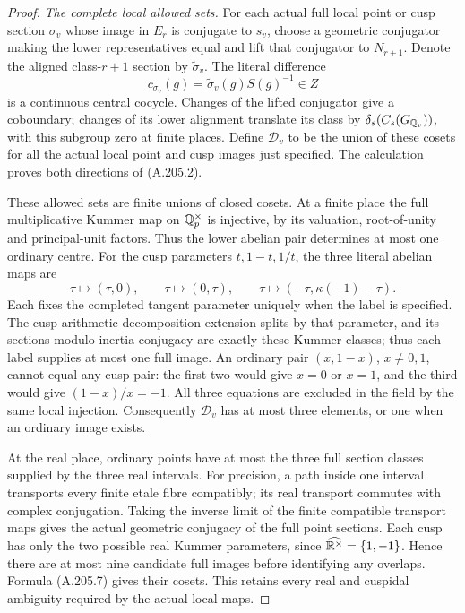 \begin{proof}
\emph{The complete local allowed sets.}
For each actual full local point or cusp section \(\sigma_v\)
whose image in \(E_r\) is conjugate to \(s_v\), choose
a geometric conjugator making the lower representatives
equal and lift that conjugator to \(N_{r+1}\).
Denote the aligned class-\(r+1\) section by
\(\widetilde\sigma_v\).  The literal difference
\[
 c_{\sigma_v}(g)=\widetilde\sigma_v(g)S(g)^{-1}\in Z
\tag{A.205.8}
\]
is a continuous central cocycle.  Changes of the lifted
conjugator give a coboundary; changes of its lower alignment
translate its class by \(\delta_s(C_s(G_{\mathbb Q_v}))\),
with this subgroup zero at finite places.  Define
\(\mathcal D_v\) to be the union of these cosets for all
the actual local point and cusp images just specified.
The calculation proves both directions of (A.205.2).

These allowed sets are finite unions of closed cosets.
At a finite place the full multiplicative Kummer map on
\(\mathbb Q_p^\times\) is injective, by its valuation, root-of-unity
and principal-unit factors.  Thus the lower abelian pair
determines at most one ordinary centre.  For the cusp
parameters \(t,1-t,1/t\), the three literal abelian maps are
\[
 \tau\longmapsto(\tau,0),\qquad
 \tau\longmapsto(0,\tau),\qquad
 \tau\longmapsto(-\tau,\kappa(-1)-\tau).
\tag{A.205.9}
\]
Each fixes the completed tangent parameter uniquely when
the label is specified.  The cusp arithmetic decomposition
extension splits by that parameter, and its sections modulo
inertia conjugacy are exactly these Kummer classes; thus
each label supplies at most one full image.  An ordinary
pair \((x,1-x)\), \(x\ne0,1\), cannot equal any cusp
pair: the first two would give \(x=0\) or \(x=1\), and
the third would give \((1-x)/x=-1\).  All three equations
are excluded in the field by the same local injection.
Consequently \(\mathcal D_v\) has at most three elements,
or one when an ordinary image exists.

At the real place, ordinary points have at most the three
full section classes supplied by the three real intervals.
For precision, a path inside one interval transports every
finite etale fibre compatibly; its real transport commutes
with complex conjugation.  Taking the inverse limit of the
finite compatible transport maps gives the actual geometric
conjugacy of the full point sections.  Each cusp has only
the two possible real Kummer parameters, since
\(\widehat{\mathbb R^\times}=\{1,-1\}\).  Hence there are at
most nine candidate full images before identifying any
overlaps.  Formula (A.205.7) gives their cosets.  This
retains every real and cuspidal ambiguity required by the
actual local maps.


\end{proof}
